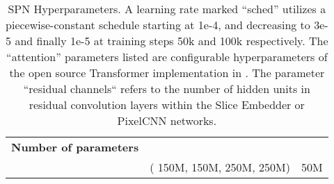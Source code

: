 \documentclass{article} \usepackage{iclr2019_conference,times}
\begin{document}
\begin{table}[t]
\begin{center}
\begin{tabular}{ccc}
\hline
\hline
\bf{Number of parameters} & & \\
 & ( 150M,  150M,  250M,  250M) &  50M \\

\end{tabular}
\caption{SPN Hyperparameters. A learning rate marked ``sched'' utilizes a piecewise-constant schedule starting at 1e-4, and decreasing to 3e-5 and finally 1e-5 at training steps 50k and 100k respectively. The ``attention'' parameters listed are configurable hyperparameters of the open source Transformer implementation in \citet{tensor2tensor}. The parameter ``residual channels`` refers to the number of hidden units in residual convolution layers within the Slice Embedder or PixelCNN networks.}
\end{center}
\label{table:hpn_hparams}
\end{table}
 
\end{document}
